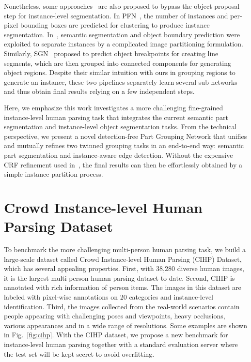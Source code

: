 \documentclass[runningheads]{llncs}
\begin{document}
Nonetheless, some approaches~\cite{liang2015proposal,Kirillov_2017_CVPR,Liu_2017_ICCV,Ren_2017_CVPR,Bai_2017_CVPR,romera2016recurrent} are also proposed to bypass the object proposal step for instance-level segmentation. In PFN~\cite{liang2015proposal}, the number of instances and per-pixel bounding boxes are predicted for clustering to produce instance segmentation. In~\cite{Kirillov_2017_CVPR}, semantic segmentation and object boundary prediction were exploited to separate instances by a complicated image partitioning formulation. Similarly, SGN~\cite{Liu_2017_ICCV} proposed to predict object breakpoints for creating line segments, which are then grouped into connected components for generating object regions. Despite their similar intuition with ours in grouping regions to generate an instance, these two pipelines separately learn several sub-networks and thus obtain final results relying on a few independent steps.

Here, we emphasize this work investigates a more challenging fine-grained instance-level human parsing task that integrates the current semantic part segmentation and instance-level object segmentation tasks. From the technical perspective, we present a novel detection-free Part Grouping Network that unifies and mutually refines two twinned grouping tasks in an end-to-end way: semantic part segmentation and instance-aware edge detection. Without the expensive CRF refinement used in~\cite{li2017holistic}, the final results can then be effortlessly obtained by a simple instance partition process. 





\section{Crowd Instance-level Human Parsing Dataset}
To benchmark the more challenging multi-person human parsing task, we build a large-scale dataset called Crowd Instance-level Human Parsing (CIHP) Dataset, which has several appealing properties. First, with 38,280 diverse human images, it is the largest multi-person human parsing dataset to date. Second, CIHP is annotated with rich information of person items. The images in this dataset are labeled with pixel-wise annotations on 20 categories and instance-level identification. Third, the images collected from the real-world scenarios contain people appearing with challenging poses and viewpoints, heavy occlusions, various appearances and in a wide range of resolutions. Some examples are shown in Fig.~\ref{fig:cihp}. With the CIHP dataset, we propose a new benchmark for instance-level human parsing together with a standard evaluation server where the test set will be kept secret to avoid overfitting.
\end{document}
